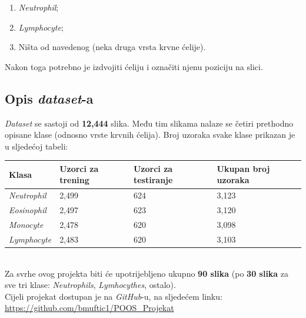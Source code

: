\documentclass[12pt,a4paper]{article}
\renewcommand{\arraystretch}{1.5}
\begin{document}
\begin{enumerate}

\item \textit{Neutrophil};
\item \textit{Lymphocyte};
\item Ništa od navedenog (neka druga vrsta krvne ćelije).

\end{enumerate}

Nakon toga potrebno je izdvojiti ćeliju i označiti njenu poziciju na slici.

\subsection{Opis \textit{dataset}-a}

\textit{Dataset} se sastoji od \textbf{12,444} slika. Među tim slikama nalaze se četiri prethodno opisane klase (odnosno vrste krvnih ćelija). Broj uzoraka svake klase prikazan je u sljedećoj tabeli: \\

\begin{center}
\def\arraystretch{1.5}%
\begin{tabular}{| p{3cm} | p{3cm} | p{3cm} | p{3cm} |} \hline

\textbf{Klasa} 						& \textbf{Uzorci za trening}			& \textbf{Uzorci za testiranje}			& \textbf{Ukupan broj uzoraka} 	\\ \hline
\textit{Neutrophil} 					& 2,499								& 624								& 3,123	  						\\ \hline
\textit{Eosinophil} 					& 2,497								& 623								& 3,120	  						\\ \hline
\textit{Monocyte} 					& 2,478								& 620								& 3,098	  						\\ \hline
\textit{Lymphocyte} 					& 2,483								& 620								& 3,103	  						\\ \hline

\end{tabular}
\end{center}

~\\

Za svrhe ovog projekta biti će upotrijebljeno ukupno \textbf{90 slika} (po \textbf{30 slika} za sve tri klase: \textit{Neutrophils}, \textit{Lymhocythes}, ostalo). \\

Cijeli projekat dostupan je na \textit{GitHub}-u, na sljedećem linku: \url{https://github.com/bmuftic1/POOS_Projekat}
\end{document}
